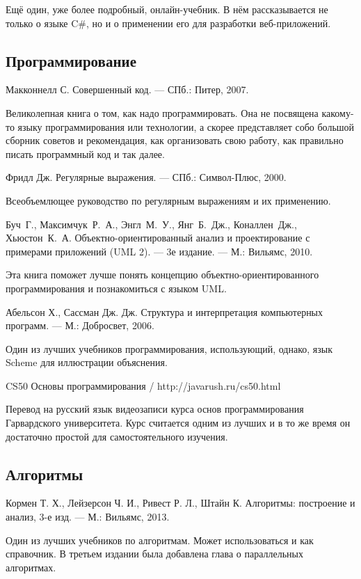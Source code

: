 \begin{thebibliography}{99}
  Ещё один, уже более подробный, онлайн-учебник. В нём рассказывается
  не только о языке C\#, но и о применении его для разработки
  веб-приложений.

  \subsection*{Программирование}

  Макконнелл С. Совершенный код. — СПб.: Питер, 2007.

  Великолепная книга о том, как надо программировать. Она не посвящена
  какому-то языку программирования или технологии, а скорее
  представляет собо большой сборник советов и рекомендация, как
  организовать свою работу, как правильно писать программный код и так
  далее.

  Фридл Дж. Регулярные выражения. — СПб.: Символ-Плюс, 2000.

  Всеобъемлющее руководство по регулярным выражениям и их применению.

  Буч~Г., Максимчук~Р.~А., Энгл~М.~У., Янг~Б.~Дж., Коналлен~Дж., Хьюстон~К.~А. Объектно-ориентированный анализ и проектирование с примерами приложений (UML 2). — 3е издание. — М.: Вильямс, 2010.

  Эта книга поможет лучше понять концепцию объектно-ориентированного
  программирования и познакомиться с языком UML.

  Абельсон Х., Сассман Дж. Дж. Структура и интерпретация компьютерных программ. — М.: Добросвет, 2006.

  Один из лучших учебников программирования, использующий, однако,
  язык Scheme для иллюстрации объяснения.

  CS50 Основы программирования / http://javarush.ru/cs50.html

  Перевод на русский язык видеозаписи курса основ программирования
  Гарвардского университета.  Курс считается одним из лучших и в то же
  время он достаточно простой для самостоятельного изучения.

  \subsection*{Алгоритмы}
  
  Кормен Т. Х., Лейзерсон Ч. И., Ривест Р. Л., Штайн К. Алгоритмы: построение и анализ, 3-е изд. — М.: Вильямс, 2013.
  
  Один из лучших учебников по алгоритмам. Может использоваться и как
  справочник. В третьем издании была добавлена глава о параллельных
  алгоритмах.
  

\end{thebibliography}
